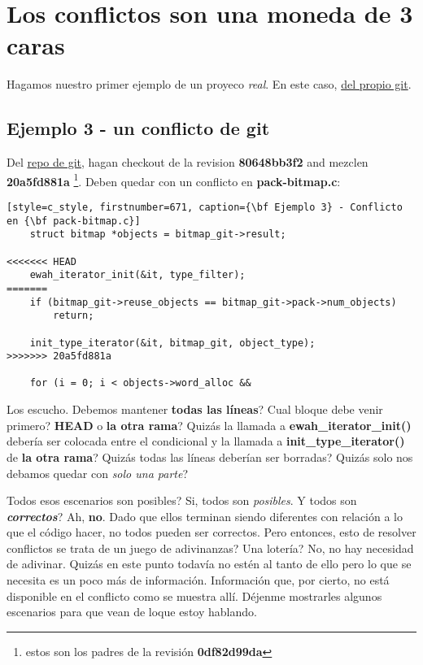 
\section{Los conflictos son una moneda de 3 caras}

Hagamos nuestro primer ejemplo de un proyeco {\it real}. En este caso, \hyperref[git_repo]{del propio git}.

\subsection{Ejemplo 3 - un conflicto de git}
\label{example_03}

Del \hyperref[git_repo]{repo de git}, hagan checkout de la revision {\bf 80648bb3f2} and mezclen {\bf 20a5fd881a}
\footnote{estos son los padres de la revisión {\bf 0df82d99da}}. Deben quedar con un conflicto en {\bf pack-bitmap.c}:
\begin{lstlisting}[style=c_style, firstnumber=671, caption={\bf Ejemplo 3} - Conflicto en {\bf pack-bitmap.c}]
	struct bitmap *objects = bitmap_git->result;

<<<<<<< HEAD
	ewah_iterator_init(&it, type_filter);
=======
	if (bitmap_git->reuse_objects == bitmap_git->pack->num_objects)
		return;

	init_type_iterator(&it, bitmap_git, object_type);
>>>>>>> 20a5fd881a

	for (i = 0; i < objects->word_alloc &&
\end{lstlisting}

Los escucho. Debemos mantener {\bf todas las líneas}? Cual bloque debe venir primero? {\bf HEAD} o
{\bf la otra rama}? Quizás la llamada a {\bf ewah\_iterator\_init()} debería ser colocada entre el condicional y
la llamada a {\bf init\_type\_iterator()} de {\bf la otra rama}? Quizás todas las líneas deberían ser borradas?
Quizás solo nos debamos quedar con {\it solo una parte}?

Todos esos escenarios son posibles? Si, todos son {\it posibles}. Y todos son {\bf\it correctos}? Ah, {\bf no}. Dado que ellos
terminan siendo diferentes con relación a lo que el código hacer, no todos pueden ser correctos. Pero entonces, esto de
resolver conflictos se trata de un juego de adivinanzas? Una lotería? No, no hay necesidad de adivinar. Quizás en este punto
todavía no estén al tanto de ello pero lo que se necesita es un poco más de información. Información que, por cierto, no está
disponible en el conflicto como se muestra allí. Déjenme mostrarles algunos escenarios para que vean de loque estoy hablando.

